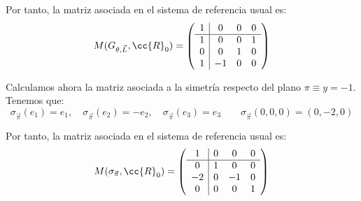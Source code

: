 \begin{ejercicio}
    Por tanto, la matriz asociada en el sistema de referencia usual es:
    \begin{equation*}
        M(G_{\theta, \vec{L}}, \cc{R}_0) = \left(
        \begin{array}{c|ccc}
            1 & 0 & 0 & 0 \\ \hline
            1 & 0 & 0 & 1 \\
            0 & 0 & 1 & 0 \\
            1 & -1 & 0 & 0
        \end{array}
        \right)
    \end{equation*}

    Calculamos ahora la matriz asociada a la simetría respecto del plano $\pi\equiv y=-1$. Tenemos que:
    \begin{equation*}
        \sigma_{\vec{\pi}}(e_1) = e_1, \quad \sigma_{\vec{\pi}}(e_2) = -e_2, \quad \sigma_{\vec{\pi}}(e_3) = e_3 \qquad \sigma_{\vec{\pi}}(0,0,0) = (0,-2,0)
    \end{equation*}

    Por tanto, la matriz asociada en el sistema de referencia usual es:
    \begin{equation*}
        M(\sigma_{\vec{\pi}}, \cc{R}_0) = \left(
        \begin{array}{c|ccc}
            1 & 0 & 0 & 0 \\ \hline
            0 & 1 & 0 & 0 \\
            -2 & 0 & -1 & 0 \\
            0 & 0 & 0 & 1
        \end{array}
        \right)
    \end{equation*}


\end{ejercicio}
